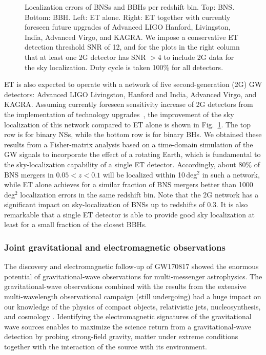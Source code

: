 \begin{figure}[t]
\caption{Localization errors of BNSs and BBHs per redshift bin. Top: BNS. Bottom: BBH. Left: ET alone. Right: ET together with currently foreseen future upgrades of Advanced LIGO Hanford, Livingston, India, Advanced Virgo, and KAGRA. We impose a conservative ET detection threshold SNR of 12, and for the plots in the right column that at least one 2G detector has SNR $> 4$ to include 2G data for the sky localization. Duty cycle is taken 100\% for all detectors.}
\label{fig:gw_ET2G}
\end{figure} 

ET is also expected to operate with a network of five second-generation (2G) GW detectors: Advanced LIGO Livingston, Hanford and India, Advanced Virgo, and KAGRA. Assuming currently foreseen sensitivity increase of 2G detectors from the implementation of technology upgrades~\citep{Aasi:2013wya}, the improvement of the sky localization of this network compared to ET alone is shown in Fig.~\ref{fig:gw_ET2G}. The top row is for binary NSs, while the bottom row is for binary BHs. We obtained these results from a Fisher-matrix analysis based on a time-domain simulation of the GW signals to incorporate the effect of a rotating Earth, which is fundamental to the sky-localization capability of a single ET detector. Accordingly, about 80\% of BNS mergers in $0.05 < z < 0.1$ will be localized within 10\,deg$^2$ in such a network, while ET alone achieves for a similar fraction of BNS mergers better than 1000\,deg$^2$ localization errors in the same redshift bin. Note that the 2G network has a significant impact on sky-localization of BNSs up to redshifts of 0.3. It is also remarkable that a single ET detector is able to provide good sky localization at least for a small fraction of the closest BBHs.


\subsubsection{Joint gravitational and electromagnetic observations}
\label{sec:MM-EM}

The discovery and electromagnetic follow-up of GW170817 showed the enormous potential  of gravitational-wave observations for multi-messenger astrophysics. The gravitational-wave observations combined with the results from the extensive multi-wavelength observational campaign (still undergoing) had a huge impact on our knowledge of the physics of compact objects, relativistic jets, nucleosynthesis, and cosmology \citep[see e.g.,][]{Abbott:2019,Radice:2019,Mooley:2018, Ghirlanda:2019,Cote:2018,Kasen:2017,Abbott:2017xzu,Hotokezaka:2019}. Identifying the electromagnetic signatures of the gravitational wave sources enables to maximize the science return from a gravitational-wave detection by probing  strong-field gravity,  matter under extreme conditions together with the interaction of the source with its environment.  


